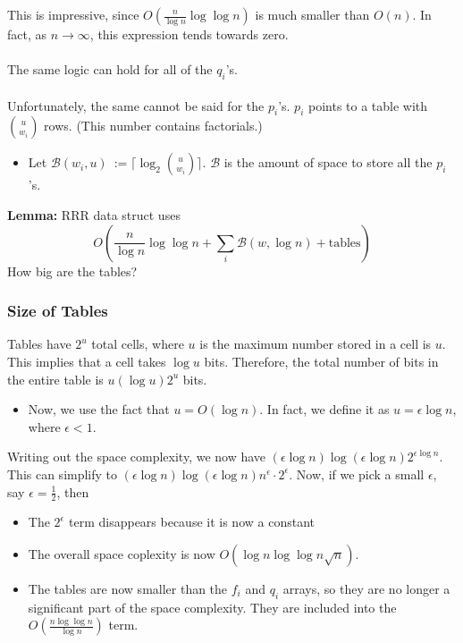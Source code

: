 \documentclass[10pt]{article}
\begin{document}
This is impressive, since $O(\frac{n}{\log n} \log \log n)$ is much smaller than $O(n)$.  In fact, as $n \rightarrow \infty$, this expression tends towards zero.\\\\
The same logic can hold for all of the $q_i$'s.\\\\
Unfortunately, the same cannot be said for the $p_i$'s.  $p_i$ points to a table with ${u \choose w_i}$ rows.  (This number contains factorials.)
\begin{itemize}
    \item Let $\mathcal{B}(w_i, u) \::= \lceil \log_2 {u \choose w_i}\rceil$.  $\mathcal{B}$ is the amount of space to store all the $p_i$'s.
\end{itemize}

\textbf{Lemma:} RRR data struct uses
\[O \left(\frac{n}{\log n} \log \log n + \sum_i \mathcal{B} (w, \log n) + \text{tables}\right)\]
How big are the tables?

\subsubsection*{Size of Tables}
Tables have $2^u$ total cells, where $u$ is the maximum number stored in a cell is $u$.  This implies that a cell takes $\log u$ bits.  Therefore, the total number of bits in the entire table is $u (\log u) 2^u$ bits.
\begin{itemize}
    \item Now, we use the fact that $u = O(\log n)$.  In fact, we define it as $u = \epsilon \log n$, where $\epsilon < 1$.
\end{itemize}
Writing out the space complexity, we now have $(\epsilon \log n) \log (\epsilon \log n) 2^{\epsilon \log n}$.  This can simplify to $(\epsilon \log n) \log (\epsilon \log n) n^\epsilon \cdot 2^\epsilon$.  Now, if we pick a small $\epsilon$, say $\epsilon = \frac{1}{2}$, then
\begin{itemize}
    \item The $2^\epsilon$ term disappears because it is now a constant
    \item The overall space coplexity is now $O(\log n \log \log n\sqrt{n})$.
    \item The tables are now smaller than the $f_i$ and $q_i$ arrays, so they are no longer a significant part of the space complexity.  They are included into the $O(\frac{n \log \log n}{\log n})$ term.
\end{itemize}
\end{document}
